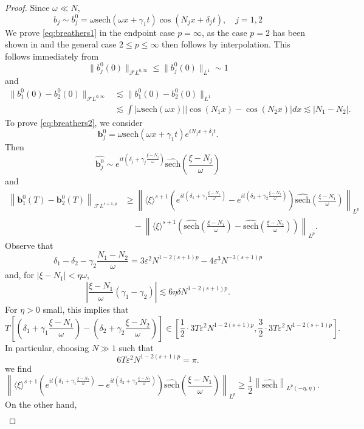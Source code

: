\documentclass[a4paper,
11pt,  reqno]{amsart}
\newcommand{\jap}[1]{\langle #1 \rangle}
\newcommand{\5}{\textup{V}}
\newcommand{\sech}{\text{sech}}
\newcommand{\FL}{\mathcal{F} L}
\newcommand{\eps}{\varepsilon}
\theoremstyle{remark}
\numberwithin{equation}{section}
\numberwithin{theorem}{section}
\begin{document}
\begin{proof}
	Since $\omega\ll N$, 
	$$
	b_j\sim b_j^0=\omega \sech(\omega x + \gamma_1 t)\cos(N_jx+\delta_jt),\quad j=1,2
	$$
	We prove \eqref{eq:breathers1} in the endpoint case $p=\infty$, as the case $p=2$ has been shown in \cite{KPV_ill} and the general case $2\le p \le \infty$ then follows by interpolation. This follows immediately from
	$$
	\|b_j^0(0)\|_{\FL^{0,\infty}}\le \|b_j^0(0)\|_{L^1}\sim 1
	$$
	and
\begin{align*}
		\|b_1^0(0)-b_2^0(0)\|_{\FL^{0,\infty}}&\lesssim \|b_1^0(0)-b_2^0(0)\|_{L^1}\\&\lesssim \int |\omega \sech (\omega x)||\cos(N_1x)-\cos(N_2x)|dx \lesssim  |N_1-N_2|.
\end{align*}
To prove \eqref{eq:breathers2}, we consider
$$
\mathbf{b}_j^0 = \omega \sech(\omega x + \gamma_1 t)e^{iN_jx+\delta_jt}.
$$
Then
$$
\widehat{\mathbf{b}_j^0} \sim e^{it\left(\delta_j+\gamma_j\frac{\xi-N_j}{\omega}\right)}\widehat{\sech}\left(\frac{\xi-N_j}{\omega}\right)
$$
and
\begin{align*}
	\left\| {\mathbf{b}_1^0}(T)  -{\mathbf{b}_2^0}(T) \right\|_{\FL^{s+1,p}}&\ge \left\|\jap{\xi}^{s+1} \left(e^{it\left(\delta_1+\gamma_1\frac{\xi-N_1}{\omega}\right)}- e^{it\left(\delta_2+\gamma_2\frac{\xi-N_2}{\omega}\right)}\right)\widehat{\sech}\left(\frac{\xi-N_1}{\omega}\right)\right\|_{L^p}\\&\quad - \left\|\jap{\xi}^{s+1}\left( \widehat{\sech}\left(\frac{\xi-N_1}{\omega}\right)-\widehat{\sech}\left(\frac{\xi-N_2}{\omega}\right)\right)\right\|_{L^p}.
\end{align*}
Observe that
$$
\delta_1-\delta_2-\gamma_2\frac{N_1-N_2}{\omega}=3\eps^2N^{1-2(s+1)p}  -4\eps^3N^{-3(s+1)p}
$$
and, for $|\xi-N_1|<\eta \omega$,
$$
\left|\frac{\xi-N_1}{\omega}(\gamma_1-\gamma_2)\right| \lesssim 6\eta \delta N^{1-2(s+1)p}. 
$$
For $\eta>0$ small, this implies that 
$$
T\left[\left(\delta_1+\gamma_1\frac{\xi-N_1}{\omega}\right) - \left(\delta_2+\gamma_2\frac{\xi-N_2}{\omega}\right)\right] \in \left[ \frac12\cdot3T\eps^2N^{1-2(s+1)p} , \frac32\cdot3T\eps^2N^{1-2(s+1)p}  \right].
$$
In particular, choosing $N\gg 1$ such that
$$
6T\eps^2N^{1-2(s+1)p} = \pi.
$$
we find
$$
 \left\|\jap{\xi}^{s+1} \left(e^{it\left(\delta_1+\gamma_1\frac{\xi-N_1}{\omega}\right)}- e^{it\left(\delta_2+\gamma_2\frac{\xi-N_2}{\omega}\right)}\right)\widehat{\sech}\left(\frac{\xi-N_1}{\omega}\right)\right\|_{L^p} \ge \frac{1}{2} \left\|\widehat{\sech}\right\|_{L^p(-\eta, \eta)}.
$$
On the other hand,
\begin{align*}

\end{align*}
\end{proof}
\end{document}
